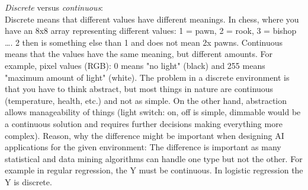 \documentclass[10pt,a4paper]{article}
\begin{document}
		 
		\noindent \textit{Discrete} versus \textit{continuous}:
		\\ 
		Discrete means that different values have different meanings. In chess, where you have an 8x8 array representing different values: 1 = pawn, 2 = rook, 3 = bishop \dots. 2 then is something else than 1 and does not mean 2x pawns.
		Continuous means that the values have the same meaning, but different amounts. For example, pixel values (RGB): 0 means "no light" (black) and 255 means "maximum amount of light" (white).
		The problem in a discrete environment is that you have to think abstract, but most things in nature are continuous (temperature, health, etc.) and not as simple. On the other hand, abstraction allows manageability of things (light switch: on, off is simple, dimmable would be a continuous solution and requires further decisions making everything more complex).
		Reason, why the difference might be important when designing AI applications for the given environment:
		The difference is important as many statistical and data mining algorithms can handle one type but not the other. For example in regular regression, the Y must be continuous. In logistic regression the Y is discrete.
		\\


		
		
\end{document}

